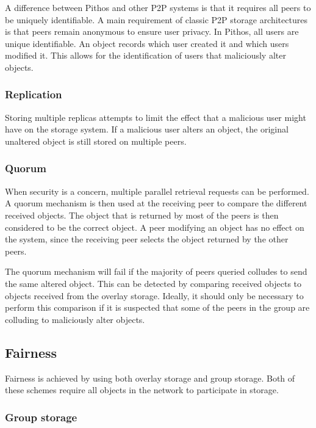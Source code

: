 A difference between Pithos and other P2P systems is that it requires all peers to be uniquely identifiable. A main requirement of classic P2P storage architectures is that peers remain anonymous to ensure user privacy. In Pithos, all users are unique identifiable. An object records which user created it and which users modified it. This allows for the identification of users that maliciously alter objects.

\subsubsection{Replication}

Storing multiple replicas attempts to limit the effect that a malicious user might have on the storage system. If a malicious user alters an object, the original unaltered object is still stored on multiple peers.

\subsubsection{Quorum}

When security is a concern, multiple parallel retrieval requests can be performed. A quorum mechanism is then used at the receiving peer to compare the different received objects. The object that is returned by most of the peers is then considered to be the correct object. A peer modifying an object has no effect on the system, since the receiving peer selects the object returned by the other peers.

The quorum mechanism will fail if the majority of peers queried colludes to send the same altered object. This can be detected by comparing received objects to objects received from the overlay storage. Ideally, it should only be necessary to perform this comparison if it is suspected that some of the peers in the group are colluding to maliciously alter objects.

\subsection{Fairness}

Fairness is achieved by using both overlay storage and group storage. Both of these schemes require all objects in the network to participate in storage.

\subsubsection{Group storage}


